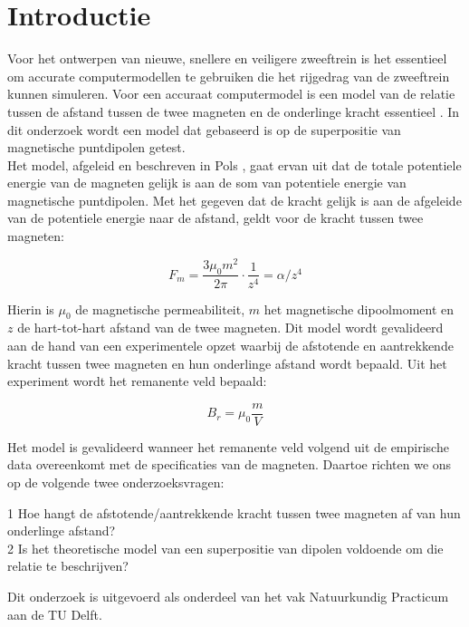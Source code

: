 \chapter{Introductie}
Voor het ontwerpen van nieuwe, snellere en veiligere zweeftrein is het essentieel om accurate computermodellen te gebruiken die het rijgedrag van de zweeftrein kunnen simuleren. Voor een accuraat computermodel is een model van de relatie tussen de afstand tussen de twee magneten en de onderlinge kracht essentieel \cite{sanagawa2001characteristics}. In dit onderzoek wordt een model dat gebaseerd is op de superpositie van magnetische puntdipolen getest. \\
Het model, afgeleid en beschreven in Pols \cite{Pols2019}, gaat ervan uit dat de totale potentiele energie van de magneten gelijk is aan de som van potentiele energie van magnetische puntdipolen. Met het gegeven dat de kracht gelijk is aan de afgeleide van de potentiele energie naar de afstand, geldt voor de kracht tussen twee magneten:

\begin{equation}
    F_m=\frac{3\mu_0 m^{2}}{2\pi}\cdot  \frac{1}{z^4} =\alpha/z^4 
\end{equation}
				
Hierin is $\mu_0$ de magnetische permeabiliteit, $m$ het magnetische dipoolmoment en $z$ de hart-tot-hart afstand van de twee magneten. Dit model wordt gevalideerd aan de hand van een experimentele opzet waarbij de afstotende en aantrekkende kracht tussen twee magneten en hun onderlinge afstand wordt bepaald. Uit het experiment wordt het remanente veld bepaald:

\begin{equation}
    B_r=\mu_0 \frac{m}{V}	
\end{equation}

Het model is gevalideerd wanneer het remanente veld volgend uit de empirische data overeenkomt met de specificaties van de magneten. Daartoe richten we ons op de volgende twee onderzoeksvragen:\\
\begin{center}
    1	Hoe hangt de afstotende/aantrekkende kracht tussen twee magneten af van hun onderlinge afstand?\\
    2	Is het theoretische model van een superpositie van dipolen voldoende om die relatie te beschrijven?\\
\end{center}
Dit onderzoek is uitgevoerd als onderdeel van het vak Natuurkundig Practicum aan de TU Delft.
